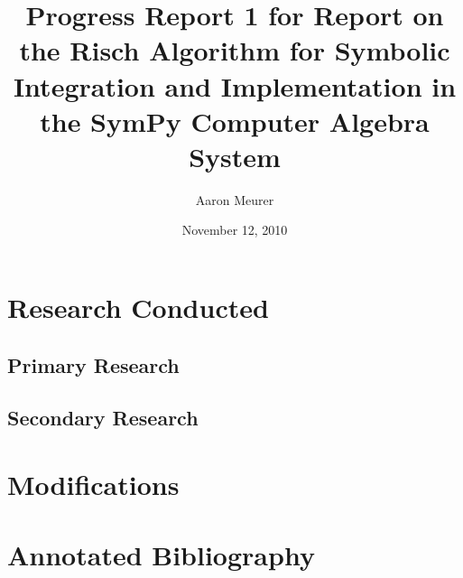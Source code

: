 \documentclass[12pt]{article}
\begin{document}
\title{Progress Report 1 for Report on the Risch Algorithm for Symbolic
Integration and Implementation in the Sym\-Py Computer Algebra System}
\author{Aaron Meurer}
\date{November 12, 2010}
\maketitle


\section{Research Conducted}
\subsection{Primary Research}

\subsection{Secondary Research}

\section{Modifications}

\section{Annotated Bibliography}

\nocite{*}


\end{document}
